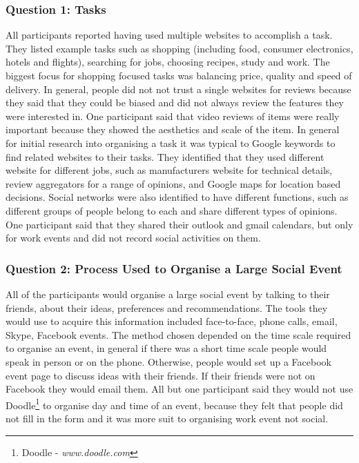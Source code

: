 \documentclass{sigchi}
\begin{document}
\subsubsection{Question 1: Tasks}
All participants reported having used multiple websites to accomplish a task.  They listed example tasks such as shopping (including food, consumer electronics, hotels and flights), searching for jobs, choosing recipes, study and work.  The biggest focus for shopping focused tasks was balancing price, quality and speed of delivery.  In general, people did not not trust a single websites for reviews because they said that they could be biased and did not always review the features they were interested in.  One participant said that video reviews of items were really important because they showed the aesthetics and scale of the item.  In general for initial research into organising a task it was typical to Google keywords to find related websites to their tasks.  They identified that they used different website for different jobs, such as manufacturers website for technical details, review aggregators for a range of opinions, and Google maps for location based decisions.  Social networks were also identified to have different functions, such as different groups of people belong to each and share different types of opinions.  One participant said that they shared their outlook and gmail calendars, but only for work events and did not record social activities on them.

\subsubsection{Question 2: Process Used to Organise a Large Social Event}
All of the participants would organise a large social event by talking to their friends, about their ideas, preferences and recommendations.  The tools they would use to acquire this information included face-to-face, phone calls, email, Skype, Facebook events.  The method chosen depended on the time scale required to organise an event, in general if there was a short time scale people would speak in person or on the phone.  Otherwise, people would set up a Facebook event page to discuss ideas with their friends.  If their friends were not on Facebook they would email them.  All but one participant said they would not use Doodle\footnote{Doodle - \emph{www.doodle.com}} to organise day and time of an event, because they felt that people did not fill in the form and it was more suit to organising work event not social.  
\end{document}
